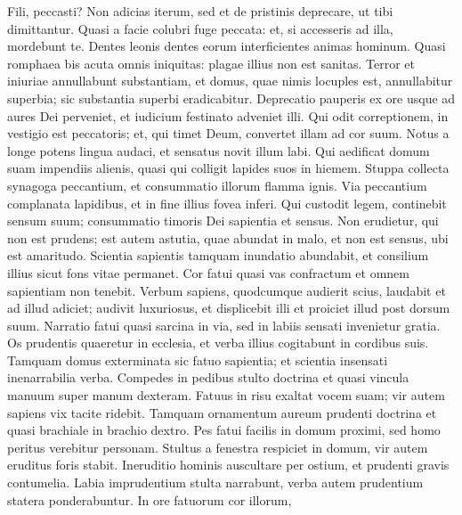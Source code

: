 \begin{biblechapter}
\begin{biblechapter}
\begin{biblechapter}
\begin{biblechapter}
\begin{biblechapter}
\begin{biblechapter}
\begin{biblechapter}
\begin{biblechapter}
\begin{biblechapter}
\begin{biblechapter}
\begin{biblechapter}
\begin{biblechapter}
\begin{biblechapter}
\begin{biblechapter}
\begin{biblechapter}
\begin{biblechapter}
\begin{biblechapter}
\begin{biblechapter}
\begin{biblechapter}
\begin{biblechapter}
\begin{biblechapter}
\verse Fili, peccasti? Non adicias iterum,
 sed et de pristinis deprecare, ut tibi dimittantur.
 \verse Quasi a facie colubri fuge peccata:
 et, si accesseris ad illa, mordebunt te.
 \verse Dentes leonis dentes eorum
 interficientes animas hominum.
 \verse Quasi romphaea bis acuta omnis iniquitas:
 plagae illius non est sanitas.
 \verse Terror et iniuriae annullabunt substantiam,
 et domus, quae nimis locuples est, annullabitur superbia;
 sic substantia superbi eradicabitur.
 \verse Deprecatio pauperis ex ore usque ad aures Dei perveniet,
 et iudicium festinato adveniet illi.
 \verse Qui odit correptionem, in vestigio est peccatoris;
 et, qui timet Deum, convertet illam ad cor suum.
 \verse Notus a longe potens lingua audaci,
 et sensatus novit illum labi.
 \verse Qui aedificat domum suam impendiis alienis,
 quasi qui colligit lapides suos in hiemem.
 \verse Stuppa collecta synagoga peccantium,
 et consummatio illorum flamma ignis.
 \verse Via peccantium complanata lapidibus,
 et in fine illius fovea inferi.
 \verse Qui custodit legem, continebit sensum suum;
 \verse consummatio timoris Dei sapientia et sensus.
 \verse Non erudietur, qui non est prudens;
 \verse est autem astutia, quae abundat in malo,
 et non est sensus, ubi est amaritudo.
 \verse Scientia sapientis tamquam inundatio abundabit,
 et consilium illius sicut fons vitae permanet.
 \verse Cor fatui quasi vas confractum
 et omnem sapientiam non tenebit.
 \verse Verbum sapiens, quodcumque audierit scius,
 laudabit et ad illud adiciet;
 audivit luxuriosus, et displicebit illi
 et proiciet illud post dorsum suum.
 \verse Narratio fatui quasi sarcina in via,
 sed in labiis sensati invenietur gratia.
 \verse Os prudentis quaeretur in ecclesia,
 et verba illius cogitabunt in cordibus suis.
 \verse Tamquam domus exterminata sic fatuo sapientia;
 et scientia insensati inenarrabilia verba.
 \verse Compedes in pedibus stulto doctrina
 et quasi vincula manuum super manum dexteram.
 \verse Fatuus in risu exaltat vocem suam;
 vir autem sapiens vix tacite ridebit.
 \verse Tamquam ornamentum aureum prudenti doctrina
 et quasi brachiale in brachio dextro.
 \verse Pes fatui facilis in domum proximi,
 sed homo peritus verebitur personam.
 \verse Stultus a fenestra respiciet in domum,
 vir autem eruditus foris stabit.
 \verse Ineruditio hominis auscultare per ostium,
 et prudenti gravis contumelia.
 \verse Labia imprudentium stulta narrabunt,
 verba autem prudentium statera ponderabuntur.
 \verse In ore fatuorum cor illorum,

\end{biblechapter}
\end{biblechapter}
\end{biblechapter}
\end{biblechapter}
\end{biblechapter}
\end{biblechapter}
\end{biblechapter}
\end{biblechapter}
\end{biblechapter}
\end{biblechapter}
\end{biblechapter}
\end{biblechapter}
\end{biblechapter}
\end{biblechapter}
\end{biblechapter}
\end{biblechapter}
\end{biblechapter}
\end{biblechapter}
\end{biblechapter}
\end{biblechapter}
\end{biblechapter}
